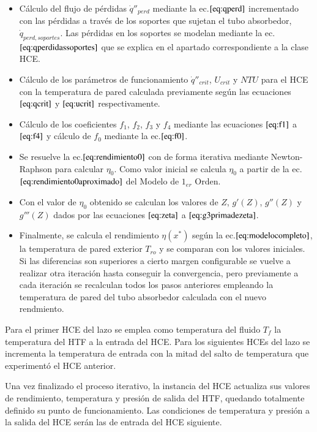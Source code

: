 \documentclass[12pt]{report} %
\begin{document}
\begin{itemize}
\item
  Cálculo del flujo de pérdidas \(\dot q''_{perd}\) mediante la   ec.\(\eqref{eq:qperd}\) incrementado con las pérdidas a través de los   soportes que sujetan el tubo absorbedor, \(\dot q_{perd,soportes}\).   Las pérdidas en los soportes se modelan mediante la   ec.\(\eqref{eq:qperdidassoportes}\) que se explica en el apartado   correspondiente a la clase HCE.
\item
  Cálculo de los parámetros de funcionamiento \(\dot q''_{crit}\),   \(U_{crit}\) y \(NTU\) para el HCE con la temperatura de pared   calculada previamente según las ecuaciones \(\eqref{eq:qcrit}\) y   \(\eqref{eq:ucrit}\) respectivamente.
\item
  Cálculo de los coeficientes \(f_1\), \(f_2\), \(f_3\) y \(f_4\)   mediante las ecuaciones \(\eqref{eq:f1}\) a \(\eqref{eq:f4}\) y   cálculo de \(f_0\) mediante la ec.\(\eqref{eq:f0}\).
\item
  Se resuelve la ec.\(\eqref{eq:rendimiento0}\) con de forma iterativa   mediante Newton-Raphson para calcular \(\eta_0\). Como valor inicial   se calcula \(\eta_0\) a partir de la   ec.\(\eqref{eq:rendimiento0aproximado}\) del Modelo de \(1_{er}\)  Orden.
\item
  Con el valor de \(\eta_0\) obtenido se calculan los valores de \(Z\),   \(g'(Z)\), \(g''(Z)\) y \(g'''(Z)\) dados por las ecuaciones   \(\eqref{eq:zeta}\) a \(\eqref{eq:g3primadezeta}\). 
\item
  Finalmente, se calcula el rendimiento \(\eta(x^*)\) según la   ec.\(\eqref{eq:modelocompleto}\), la temperatura de pared exterior   \(T_{ro}\) y se comparan con los valores iniciales. Si las diferencias   son superiores a cierto margen configurable se vuelve a realizar otra   iteración hasta conseguir la convergencia, pero previamente a cada   iteración se recalculan todos los pasos anteriores empleando la   temperatura de pared del tubo absorbedor calculada con el nuevo
  rendmiento. 
\end{itemize}

Para el primer HCE del lazo se emplea como temperatura del fluido \(T_f\) la temperatura del HTF a la entrada del HCE. Para los siguientes HCEs del lazo se incrementa la temperatura de entrada con la mitad del salto de temperatura que experimentó el HCE anterior.

Una vez finalizado el proceso iterativo, la instancia del HCE actualiza sus valores de rendimiento, temperatura y presión de salida del HTF, quedando totalmente definido su punto de funcionamiento. Las condiciones de temperatura y presión a la salida del HCE serán las de entrada del HCE siguiente.
\end{document}
